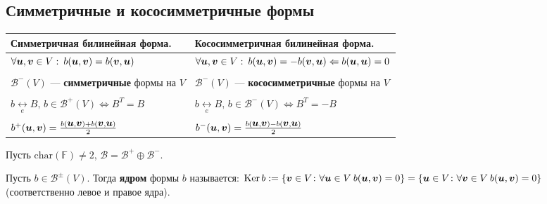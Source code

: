 \subsection{Симметричные и кососимметричные формы}

\begin{to_def} 
\begin{tabular}{|l|l|}
\hline
 Симметричная билинейная форма. & Кососимметричная билинейная форма.\\
\hline
\hline

 $\forall \mbox{\boldmath $u$}, \mbox{\boldmath $v$} \in V: \: b(\mbox{\boldmath $u$},\mbox{\boldmath $v$}) = b(\mbox{\boldmath $v$}, \mbox{\boldmath $u$})$ & 
$\forall \mbox{\boldmath $u$}, \mbox{\boldmath $v$} \in V: \: b(\mbox{\boldmath $u$},\mbox{\boldmath $v$}) = - b(\mbox{\boldmath $v$}, \mbox{\boldmath $u$}) \overset{}{\Leftarrow} b(\mbox{\boldmath $u$},\mbox{\boldmath $u$}) = 0 $\\

&\\

$\mathcal{B}^- (V)$ ---  \textbf{симметричные} формы на $V$ &
$\mathcal{B}^- (V)$ ---  \textbf{кососимметричные} формы на $V$ \\

&\\

$b \underset{e}{\longleftrightarrow} B, \, b \in \mathcal{B}^+ (V) \Leftrightarrow B^T = B$ &
$b \underset{e}{\longleftrightarrow} B, \,  b \in \mathcal{B}^- (V) \Leftrightarrow B^T = -B$ \\

&\\

$b^+(\mbox{\boldmath $u$},\mbox{\boldmath $v$}) = \frac{b(\mbox{\boldmath $u$},\mbox{\boldmath $v$}) + b (\mbox{\boldmath $v$}, \mbox{\boldmath $u$})}{2}$ &
$b^-(\mbox{\boldmath $u$},\mbox{\boldmath $v$}) = \frac{b(\mbox{\boldmath $u$},\mbox{\boldmath $v$}) - b (\mbox{\boldmath $v$}, \mbox{\boldmath $u$})}{2}$ \\

\hline
\end{tabular}
\end{to_def}

\begin{to_thr} 
	Пусть $\text{char}(\mathbb{F}) \neq 2 $, $\mathcal{B} = \mathcal{B}^+ \oplus \mathcal{B}^-$. 
\end{to_thr}

\begin{to_def} 
	Пусть $b \in \mathcal{B}^\pm (V)$. Тогда \textbf{ядром} формы $b$ называется:
	$\mathop{\mathrm{Ker}}\nolimits b := \left\{ \mbox{\boldmath $v$} \in V \colon \forall \mbox{\boldmath $u$} \in V \: b(\mbox{\boldmath $u$}, \mbox{\boldmath $v$}) = 0\right\} = \left\{ \mbox{\boldmath $u$} \in V \colon \forall \mbox{\boldmath $v$} \in V \: b(\mbox{\boldmath $u$}, \mbox{\boldmath $v$}) = 0\right\}$ (соответственно левое и правое ядра). 
\end{to_def}

